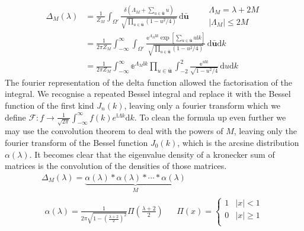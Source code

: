 \documentclass{article}[12pt]
\numberwithin{equation}{section}
\begin{document}
\begin{align*}
  \Delta_M(\lambda)&=\frac{1}{Z_M}
  \int_{\Omega'}\!
  \frac{\delta(\Lambda_M+\sum_{u\in\bar{\mathbf{u}}}u)}
  {\sqrt{\prod_{u\in\bar{\mathbf{u}}}(1-u^2/4) }}
  \,\mathrm{d}\bar{\mathbf{u}}
  \qquad
  \begin{matrix}
    \Lambda_M=\lambda+2M \\
    |\Lambda_M|\leq2M
  \end{matrix}\\
  &=\frac{1}{2\pi Z_M}
  \int_{-\infty}^{\infty}\int_{\Omega'}\!
  \frac{\mathbb{e}^{\Lambda_M\mathbb{i}k}\exp[\sum_{u\in\bar{\mathbf{u}}}u\mathbb{i}k]}
  {\sqrt{\prod_{u\in\bar{\mathbf{u}}}(1-u^2/4) }}
  \,\mathrm{d}\bar{\mathbf{u}}\mathrm{d}k\\
  &=\frac{1}{2\pi Z_M}
  \int_{-\infty}^{\infty}\mathbb{e}^{\Lambda_M\mathbb{i}k}
  \prod_{u\in\bar{\mathbf{u}}}\int_{-2}^{2}\!
  \frac{\mathbb{e}^{u\mathbb{i}k}}
  {\sqrt{1-u^2/4}}
  \,\mathrm{d}u\mathrm{d}k
\end{align*}
The fourier representation of the delta function allowed the
factorisation of the integral. We recognise a repeated Bessel
integral and replace it with the Bessel function of the first kind
$J_n(k)$, leaving only a fourier transform which we define
$ \mathcal{F} :
f\rightarrow \frac{1}{\sqrt{2\pi}}
\int_{-\infty}^{\infty}f(k)e^{\mathbb{i}\Lambda k}\mathrm{d}k$. To clean
the formula up even further we may use the convolution
theorem to deal with the powers of $M$, leaving only the fourier
transform of the Bessel function $J_0(k)$, which is the arcsine
distribution $\alpha(\lambda)$. It becomes clear that the eigenvalue
density of a kronecker sum of matrices is the convolution of the densities
of those matrices.
\begin{align}
  \Delta_M(\lambda)=\underbrace{
  \alpha(\lambda)*\alpha(\lambda)*\cdots*\alpha(\lambda)}_{M}\qquad\qquad\qquad\\
  \begin{matrix}
    \alpha(\lambda)=
      \frac{1}{2\pi\sqrt{1-\left(\frac{\lambda+2}{2}\right)^2}}
      \Pi\left(\frac{\lambda+2}{2}\right)
    &&
    \Pi(x)=
      \begin{cases}
        1 & |x|<1\\
        0 & |x|\geq1\\
      \end{cases}
  \end{matrix}
\end{align}
\end{document}
